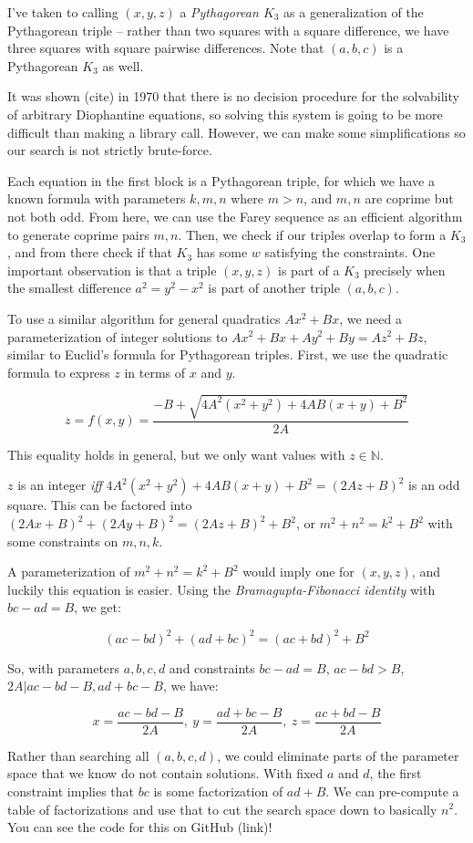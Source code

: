 \documentclass[a4paper]{amsproc}
\theoremstyle{plain}
\newcommand{\N} {\mathbb{N}}
\begin{document}
I've taken to calling $(x,y,z)$ a \textit{Pythagorean $K_3$} as a generalization of the Pythagorean triple --
rather than two squares with a square difference, we have three squares with square pairwise differences.
Note that $(a,b,c)$ is a Pythagorean $K_3$ as well.

It was shown (cite) in 1970 that there is no decision procedure for the solvability of arbitrary Diophantine equations, so solving this system is going to be more difficult than making a library call.
However, we can make some simplifications so our search is not strictly brute-force.

Each equation in the first block is a Pythagorean triple, for which we have a known formula with parameters $k,m,n$ where $m > n$, and $m,n$ are coprime but not both odd.
From here, we can use the Farey sequence as an efficient algorithm to generate coprime pairs $m,n$.
Then, we check if our triples overlap to form a $K_3$, and from there check if that $K_3$ has some $w$ satisfying the constraints.
One important observation is that a triple $(x,y,z)$ is part of a $K_3$ precisely when the smallest difference $a^2 = y^2 - x^2$ is part of another
triple $(a,b,c)$.

To use a similar algorithm for general quadratics $Ax^2+Bx$, we need a parameterization of integer solutions to $Ax^2+Bx + Ay^2+By = Az^2+Bz$,
similar to Euclid's formula for Pythagorean triples.
First, we use the quadratic formula to express $z$ in terms of $x$ and $y$.

$$z = f(x,y) = \frac{-B+\sqrt{4A^2(x^2+y^2)+4AB(x+y)+B^2}}{2A}$$

This equality holds in general, but we only want values with $z\in\N$.

$z$ is an integer \textit{iff} $4A^2(x^2+y^2)+4AB(x+y)+B^2=(2Az+B)^2$ is an odd square.
This can be factored into $(2Ax+B)^2+(2Ay+B)^2=(2Az+B)^2+B^2$, or $m^2+n^2=k^2+B^2$ with some constraints on $m,n,k$.

A parameterization of $m^2+n^2=k^2+B^2$ would imply one for $(x,y,z)$, and luckily this equation is easier.
Using the \textit{Bramagupta-Fibonacci identity} with $bc-ad=B$, we get:

$$(ac-bd)^2 + (ad+bc)^2 = (ac+bd)^2 + B^2$$

So, with parameters $a,b,c,d$ and constraints $bc-ad=B$, $ac-bd> B$, $2A\vert ac-bd-B, ad+bc-B$, we have:

$$x = \frac{ac-bd-B}{2A},\ y = \frac{ad+bc-B}{2A},\ z = \frac{ac+bd-B}{2A}$$

Rather than searching all $(a,b,c,d)$, we could eliminate parts of the parameter space that we know do not contain solutions.
With fixed $a$ and $d$, the first constraint implies that $bc$ is some factorization of $ad + B$.
We can pre-compute a table of factorizations and use that to cut the search space down to basically $n^2$.
You can see the code for this on GitHub (link)!
\end{document}
